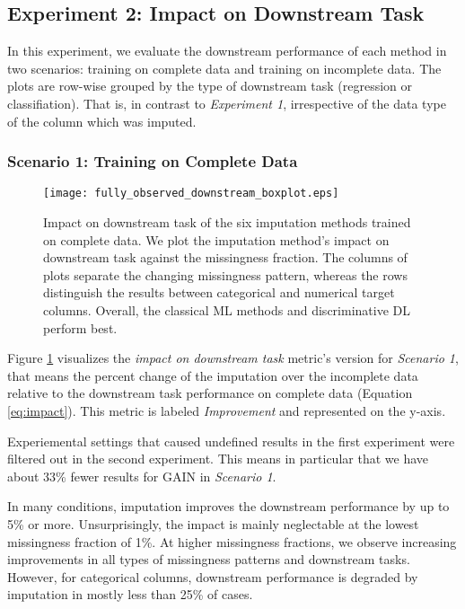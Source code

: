 \subsection{Experiment 2: Impact on Downstream Task}

In this experiment, we evaluate the downstream performance of each method in two scenarios: training on complete data and training on incomplete data. The plots are row-wise grouped by the type of downstream task (regression or classifiation). That is, in contrast to \textit{Experiment 1}, irrespective of the data type of the column which was imputed. 


\subsubsection{Scenario 1: Training on Complete Data}

\begin{figure}\centering
	\texttt{[image: fully\_observed\_downstream\_boxplot.eps]}
	\caption[Downstream Ranks - Fully Observed]{Impact on downstream task of the six imputation methods trained on complete data. We plot the imputation method's impact on downstream task against the missingness fraction. The columns of plots separate the changing missingness pattern, whereas the rows distinguish the results between categorical and numerical target columns. Overall, the classical ML methods and discriminative DL perform best.
    }
	\label{fig:fully_observed_downstream_boxplot}
\end{figure}

Figure \ref{fig:fully_observed_downstream_boxplot} visualizes the \textit{impact on downstream task} metric's version for \textit{Scenario 1}, that means the percent change of the imputation over the incomplete data relative to the downstream task performance on complete data (Equation \ref{eq:impact}). This metric is labeled \textit{Improvement} and represented on the y-axis.

Experiemental settings that caused undefined results in the first experiment were filtered out in the second experiment. This means in particular that we have about 33\% fewer results for GAIN in \textit{Scenario 1}.

In many conditions, imputation improves the downstream performance by up to 5\% or more. Unsurprisingly, the impact is mainly neglectable at the lowest missingness fraction of 1\%. At higher missingness fractions, we observe increasing improvements in all types of missingness patterns and downstream tasks. However, for categorical columns, downstream performance is degraded by imputation in mostly less than 25\% of cases.

